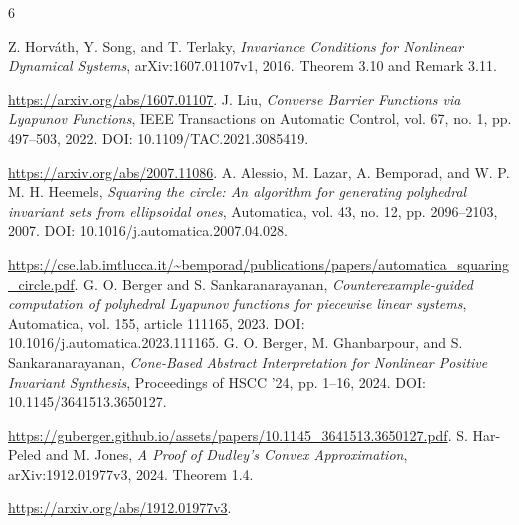 \documentclass[10pt,letterpaper]{article}
\theoremstyle{remark}
\begin{document}
\clearpage
\begin{thebibliography}{6}
\small\raggedright
{}
Z. Horv\'ath, Y. Song, and T. Terlaky,
\emph{Invariance Conditions for Nonlinear Dynamical Systems},
arXiv:1607.01107v1, 2016. Theorem 3.10 and Remark 3.11.
\par\url{https://arxiv.org/abs/1607.01107}.
J. Liu, \emph{Converse Barrier Functions via Lyapunov Functions},
IEEE Transactions on Automatic Control, vol. 67, no. 1, pp. 497--503, 2022.
DOI: 10.1109/TAC.2021.3085419.
\par\url{https://arxiv.org/abs/2007.11086}.
A. Alessio, M. Lazar, A. Bemporad, and W. P. M. H. Heemels,
\emph{Squaring the circle: An algorithm for generating polyhedral invariant sets from ellipsoidal ones},
Automatica, vol. 43, no. 12, pp. 2096--2103, 2007.
DOI: 10.1016/j.automatica.2007.04.028.
\par\url{https://cse.lab.imtlucca.it/~bemporad/publications/papers/automatica_squaring_circle.pdf}.
G. O. Berger and S. Sankaranarayanan,
\emph{Counterexample-guided computation of polyhedral Lyapunov functions for piecewise linear systems},
Automatica, vol. 155, article 111165, 2023.
DOI: 10.1016/j.automatica.2023.111165.
G. O. Berger, M. Ghanbarpour, and S. Sankaranarayanan,
\emph{Cone-Based Abstract Interpretation for Nonlinear Positive Invariant Synthesis},
Proceedings of HSCC '24, pp. 1--16, 2024.
DOI: 10.1145/3641513.3650127.
\par\url{https://guberger.github.io/assets/papers/10.1145_3641513.3650127.pdf}.
S. Har-Peled and M. Jones,
\emph{A Proof of Dudley's Convex Approximation},
arXiv:1912.01977v3, 2024. Theorem 1.4.
\par\url{https://arxiv.org/abs/1912.01977v3}.
\end{thebibliography}
\end{document}
